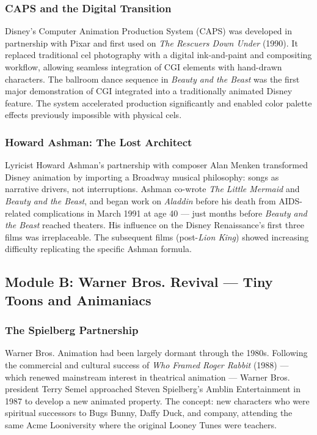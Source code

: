 \documentclass[11pt,letterpaper]{article}
\begin{document}
\subsubsection{CAPS and the Digital Transition}

Disney's Computer Animation Production System (CAPS) was developed in partnership with Pixar and first used on \textit{The Rescuers Down Under} (1990). It replaced traditional cel photography with a digital ink-and-paint and compositing workflow, allowing seamless integration of CGI elements with hand-drawn characters. The ballroom dance sequence in \textit{Beauty and the Beast} was the first major demonstration of CGI integrated into a traditionally animated Disney feature. The system accelerated production significantly and enabled color palette effects previously impossible with physical cels.

\subsubsection{Howard Ashman: The Lost Architect}

Lyricist Howard Ashman's partnership with composer Alan Menken transformed Disney animation by importing a Broadway musical philosophy: songs as narrative drivers, not interruptions. Ashman co-wrote \textit{The Little Mermaid} and \textit{Beauty and the Beast}, and began work on \textit{Aladdin} before his death from AIDS-related complications in March 1991 at age 40 --- just months before \textit{Beauty and the Beast} reached theaters. His influence on the Disney Renaissance's first three films was irreplaceable. The subsequent films (post-\textit{Lion King}) showed increasing difficulty replicating the specific Ashman formula.

\subsection{Module B: Warner Bros. Revival --- Tiny Toons and Animaniacs}

\subsubsection{The Spielberg Partnership}

Warner Bros. Animation had been largely dormant through the 1980s. Following the commercial and cultural success of \textit{Who Framed Roger Rabbit} (1988) --- which renewed mainstream interest in theatrical animation --- Warner Bros. president Terry Semel approached Steven Spielberg's Amblin Entertainment in 1987 to develop a new animated property. The concept: new characters who were spiritual successors to Bugs Bunny, Daffy Duck, and company, attending the same Acme Looniversity where the original Looney Tunes were teachers.
\end{document}
